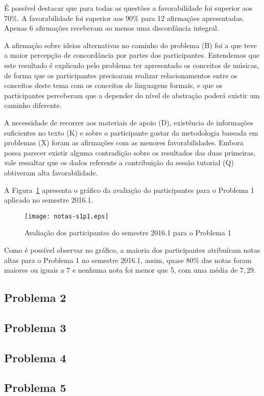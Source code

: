 É possível destacar que para todas as questões a favorabilidade
foi superior aos $70\%$. A favorabilidade foi superior aos $90\%$
para 12 afirmações apresentadas.
Apenas 6 afirmações receberam ao menos uma discordância integral.

A afirmação sobre ideias alternativas no caminho do problema (B)
foi a que teve a maior percepção de concordância por partes dos
participantes.
Entendemos que este resultado é explicado pelo problema
ter apresentado os conceitos de músicas, de forma que
os participantes precisaram realizar relacionamentos entre
os conceitos deste tema com os conceitos de linguagens
formais, e que os participantes perceberam que a depender do
nível de abstração poderá existir um caminho diferente.

A necessidade de recorrer aos materiais de apoio (D),
existência de informações suficientes no texto (K) e
sobre o participante gostar da metodologia baseada
em problemas (X) foram as afirmações com
as menores favorabilidades.
Embora possa parecer existir alguma contradição
sobre os resultados das duas primeiras, vale
ressaltar que os dados referente
a contribuição da sessão tutorial (Q) obtiveram
alta favorabilidade.

A Figura~\ref{aval-s1p1} apresenta o gráfico da
avaliação do participantes para o Problema 1 aplicado no semestre 2016.1.

\begin{figure}[!htb]
\centering
\texttt{[image: notas-s1p1.eps]}
\caption{Avaliação dos participantes do semestre 2016.1 para o Problema 1}
\label{aval-s1p1}
\end{figure}

Como é possível observar no gráfico, a maioria dos participantes atribuíram
notas altas para o Problema 1 no semestre 2016.1, assim, quase $80\%$ das notas
foram maiores ou iguais a 7 e nenhuma nota foi menor que 5, com uma média
de $7,29$.
  
\subsection{Problema 2}
\subsection{Problema 3}
\subsection{Problema 4}
\subsection{Problema 5}
